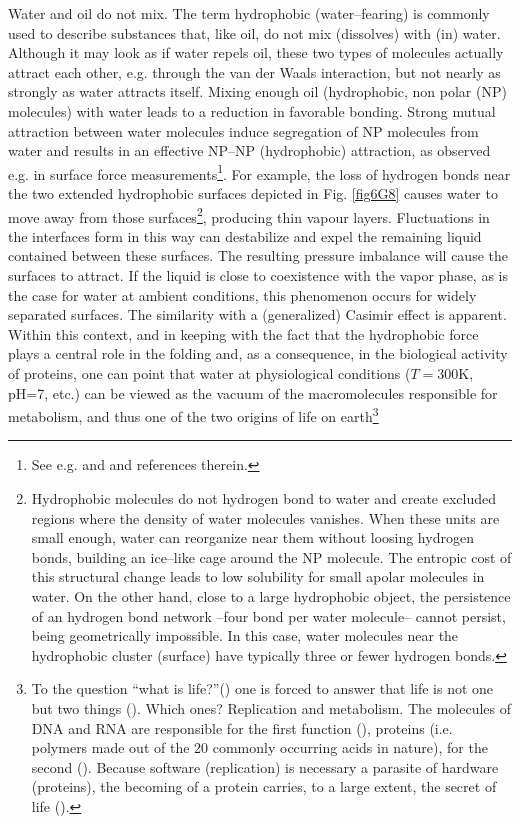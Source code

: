 \begin{subappendices}
Water and oil do not mix. The term hydrophobic (water--fearing) is commonly used to describe substances that, like oil, do not mix (dissolves) with (in) water. Although it may look as if water repels oil, these two types of molecules actually attract each other, e.g. through the van der Waals interaction, but not nearly as strongly as water attracts itself. Mixing enough oil (hydrophobic, non polar (NP) molecules) with water leads to a reduction in favorable bonding. Strong mutual attraction between water molecules induce segregation of NP molecules from water and results in an effective NP--NP (hydrophobic) attraction, as observed e.g. in surface force measurements\footnote{See e.g. \cite{Chandler:02,Chandler:05} and \cite{Lum:99} and references therein.}. For example, the loss of hydrogen bonds near the two extended hydrophobic surfaces depicted in Fig. \ref{fig6G8} causes water to move away from those surfaces\footnote{Hydrophobic molecules do not hydrogen bond to water and create excluded regions where the density of water molecules vanishes. When these units are small enough, water can reorganize near them without loosing hydrogen bonds, building an ice--like cage around the NP molecule. The entropic cost of this structural change leads to low solubility for small apolar molecules in water. On the other hand, close to a large hydrophobic object, the persistence of an hydrogen bond network --four bond per water molecule-- cannot persist, being geometrically impossible. In this case, water molecules near the hydrophobic cluster (surface) have typically three or fewer hydrogen bonds.}, producing thin vapour layers. Fluctuations in the interfaces form in this way can destabilize and expel the remaining liquid contained between these surfaces. The resulting pressure imbalance will cause the surfaces to attract. If the liquid is close to coexistence with the vapor phase, as is the case for water at ambient conditions, this phenomenon occurs for widely separated surfaces. The similarity with a (generalized) Casimir effect is apparent. Within this context, and in keeping with the fact that the hydrophobic force plays a central role in the folding and, as a consequence, in the biological activity of proteins, one can point that water at physiological conditions ($T=$300K, pH=7, etc.) can be viewed as the vacuum of the macromolecules responsible for metabolism, and thus one of the two origins of life on earth\footnote{To the question ``what is life?''(\cite{Schrodinger:44}) one is forced to answer that life is not one but two things (\cite{Dyson:99}). Which ones? Replication and metabolism. The molecules of DNA and RNA are responsible for the first function (\cite{Watson:53,Watson:80}), proteins (i.e. polymers made out of the 20 commonly occurring acids in nature), for the second (\cite{Sanger:52}). Because software (replication) is necessary a parasite of hardware (proteins), the becoming of a protein carries, to a large extent, the secret of life (\cite{Monod:70}).}



\end{subappendices}
